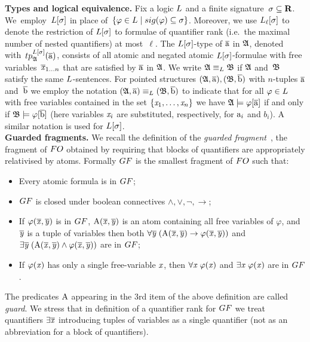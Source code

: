 \noindent \textbf{Types and logical equivalence.}
Fix a logic $\logicL$ and a finite signature~$\sigma \subseteq \mathbf{R}$. 
We~employ~$\logicL[\sigma]$ in place of~$\{ \varphi \in \logicL \mid \sig(\varphi) \subseteq \sigma \}$.
Moreover, we use $\logicL_\ell[\sigma]$ to denote the restriction of $\logicL[\sigma]$ to formulae of quantifier rank (i.e.\ the maximal number of nested quantifiers) at most~$\ell$.  
%
The $\logicL[\sigma]$-type of $\overline{\mathrm{a}}$ in ${\mathfrak{A}}$, denoted with~$\tp{\logicL[\sigma]}{\str{A}}{\elemtuplea}$, consists of all atomic and negated atomic $\logicL[\sigma]$-formulae with free variables~$\overline{\mathit{x}}_{1\ldots n}$ that are satisfied by $\overline{\mathrm{a}}$ in ${\mathfrak{A}}$.
We write $\str{A} \equiv_\logicL \str{B}$ if ${\mathfrak{A}}$ and~${\mathfrak{B}}$ satisfy the same $\logicL$-sentences.
For pointed structures $({\mathfrak{A}}, \overline{\mathrm{a}}), ({\mathfrak{B}}, \overline{\mathrm{b}})$ with $n$-tuples $\overline{\mathrm{a}}$ and~$\overline{\mathrm{b}}$ we employ the notation $(\str{A}, \elemtuplea) \equiv_\logicL (\str{B}, \elemtupleb)$ to indicate that for all $\varphi \in \logicL$ with free variables contained in the set $\{ \mathit{x}_1, \ldots, \mathit{x}_n \}$ we have ${\mathfrak{A}} \models \varphi[\overline{\mathrm{a}}]$ if and only if ${\mathfrak{B}} \models \varphi[\overline{\mathrm{b}}]$ (here variables $\mathit{x}_i$ are substituted, respectively, for $\mathrm{a}_i$ and $b_i$).
A similar notation is used for $\logicL[\sigma]$.\\

\noindent \textbf{Guarded fragments.}
We recall the definition of the \emph{guarded fragment}~\cite[Sec. 4.1]{AndrekaNB98}, \ie the fragment of $\FO$ obtained by requiring that blocks of quantifiers are appropriately relativised by atoms.
Formally $\GF$ is the smallest fragment of $\FO$  such that:
\begin{itemize}\itemsep0em
    \item Every atomic formula is in $\GF$;
    \item $\GF$ is closed under boolean connectives $\land, \lor, \neg, \to$;
    \item If $\varphi(\overline{\mathit{x}}, \overline{\mathit{y}})$ is in $\GF$, $\mathrm{A}(\overline{\mathit{x}}, \overline{\mathit{y}})$ is an atom containing all free variables of $\varphi$, and $\overline{\mathit{y}}$ is a tuple of variables then both $\forall{\overline{\mathit{y}}} \; (\mathrm{A}(\overline{\mathit{x}}, \overline{\mathit{y}}) \to \varphi(\overline{\mathit{x}}, \overline{\mathit{y}}))$ and $\exists{\overline{\mathit{y}}} \; (\mathrm{A}(\overline{\mathit{x}}, \overline{\mathit{y}}) \land \varphi(\overline{\mathit{x}}, \overline{\mathit{y}}))$ are in $\GF$; 
    \item If $\varphi(\mathit{x})$ has only a single free-variable $\mathit{x}$, then $\forall{\mathit{x}}\; \varphi(\mathit{x})$ and $\exists{\mathit{x}}\; \varphi(\mathit{x})$ are in $\GF$.
\end{itemize}
The predicates $\mathrm{A}$ appearing in the 3rd item of the above definition are called \emph{guard}.
We stress that in definition of a quantifier rank for $\GF$ we treat quantifiers $\exists{\overline{\mathit{x}}}$ introducing tuples of variables as a single quantifier (not as an abbreviation for a block of quantifiers).

